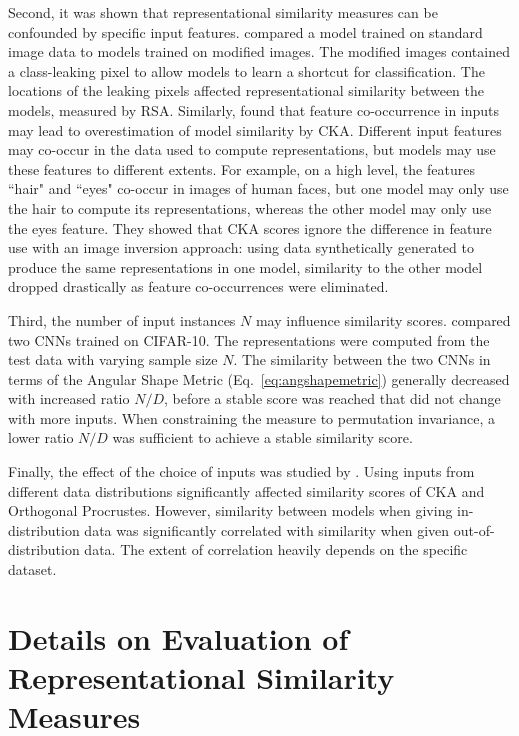 \documentclass{article}
\newcommand{\citet}{\textcite}
\newcommand\myeqref[1]{%
    (\textup{Eq.~\ref{#1}})%
}
\begin{document}
\begin{refsegment}
Second, it was shown that representational similarity measures can be confounded by specific input features.
\citet{dujmovic_pitfalls_2022} compared a model trained on standard image data to models trained on modified images.
The modified images contained a class-leaking pixel to allow models to learn a shortcut for classification.
The locations of the leaking pixels affected representational similarity between the models, measured by RSA.
Similarly, \citet{jones_if_2022} found that feature co-occurrence in inputs may lead to overestimation of model similarity by CKA.
Different input features may co-occur in the data used to compute representations, but models may use these features to different extents.
For example, on a high level, the features ``hair" and ``eyes" co-occur in images of human faces, but one model may only use the hair to compute its representations, whereas the other model may only use the eyes feature.
They showed that CKA scores ignore the difference in feature use with an image inversion approach: using data synthetically generated to produce the same representations in one model, similarity to the other model dropped drastically as feature co-occurrences were eliminated.

Third, the number of input instances $N$ may influence similarity scores.
\citet{williams_generalized_2022} compared two CNNs trained on CIFAR-10.
The representations were computed from the test data with varying sample size $N$.
The similarity between the two CNNs in terms of the Angular Shape Metric \myeqref{eq:angshapemetric} generally decreased with increased ratio $N/D$, before a stable score was reached that did not change with more inputs.
When constraining the measure to permutation invariance, a lower ratio $N/D$ was sufficient to achieve a stable similarity score.

Finally, the effect of the choice of inputs was studied by \citet{brown_wild_2024}.
Using inputs from different data distributions significantly affected similarity scores of CKA and Orthogonal Procrustes.
However, similarity between models when giving in-distribution data was significantly correlated with similarity when given out-of-distribution data.
The extent of correlation heavily depends on the specific dataset.



\section{Details on Evaluation of Representational Similarity Measures}
\label{ap:evaluation}




\end{refsegment}
\end{document}
